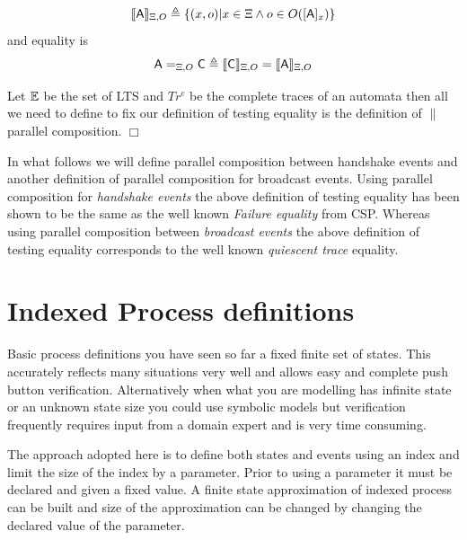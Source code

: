 \documentclass[]{article}
\begin{document}
\[
 \llbracket {\sf A}\rrbracket_{\Xi,O} \triangleq  \{(x,o) | x \in \Xi \wedge  o\in O([{\sf  A}]_x)\}
\]
and equality is
\[
{\sf A} =_{\Xi, O} {\sf  C} \triangleq   \llbracket {\sf C}\rrbracket_{\Xi,O} = \llbracket {\sf A}\rrbracket_{\Xi,O}
\]

Let $\mathbb E$ be the set of LTS and $Tr^c$ be the complete traces of an automata  then all we need to define to fix our definition of testing equality is the definition of $\parallel$ parallel composition.
\hspace{\fill}$\Box$

In what follows we will define parallel composition between handshake events  and  another definition of parallel composition for broadcast events.  Using parallel composition for \emph{handshake events} the above definition of testing equality has been shown to be the same as the well known \emph{Failure equality} from CSP.  Whereas using parallel composition between \emph{broadcast events} the above definition of testing equality corresponds to the well known \emph{quiescent trace} equality.


\section{Indexed Process definitions}


Basic process definitions you have seen so far a fixed finite set of states. This accurately reflects  many situations very well and allows easy and complete push button verification. Alternatively when what you are modelling has infinite state or an unknown state size you could use symbolic models but verification  frequently requires  input from a domain expert and is very time consuming.

The approach adopted here is to define both states and events using an index and limit the size of the index by a parameter.  Prior to using a parameter it must be declared and given a fixed value. A finite state approximation of indexed process can be built and size of the approximation can be changed by changing the declared value of the parameter.
\end{document}
